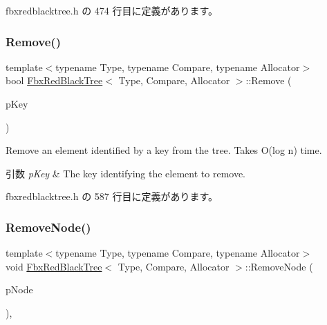  fbxredblacktree.\+h の 474 行目に定義があります。

\mbox{\label{class_fbx_red_black_tree_a432f0ed569c5ccb0273c583e59414b0b}} 
\subsubsection{\texorpdfstring{Remove()}{Remove()}}
{\footnotesize\ttfamily template$<$typename Type, typename Compare, typename Allocator$>$ \\
bool \hyperlink{class_fbx_red_black_tree}{Fbx\+Red\+Black\+Tree}$<$ Type, Compare, Allocator $>$\+::Remove (\begin{DoxyParamCaption}\item[{const \hyperlink{class_fbx_red_black_tree_a241b31c6972995417d193458b7bb27e2}{Key\+Type} \&}]{p\+Key }\end{DoxyParamCaption})\hspace{0.3cm}{\ttfamily [inline]}}

Remove an element identified by a key from the tree. Takes O(log n) time. 
\begin{DoxyParams}{引数}
{\em p\+Key} & The key identifying the element to remove. \\
\hline
\end{DoxyParams}


 fbxredblacktree.\+h の 587 行目に定義があります。

\mbox{\label{class_fbx_red_black_tree_af0e3ffcca91f083d958bec08fbd20100}} 
\subsubsection{\texorpdfstring{Remove\+Node()}{RemoveNode()}}
{\footnotesize\ttfamily template$<$typename Type, typename Compare, typename Allocator$>$ \\
void \hyperlink{class_fbx_red_black_tree}{Fbx\+Red\+Black\+Tree}$<$ Type, Compare, Allocator $>$\+::Remove\+Node (\begin{DoxyParamCaption}\item[{\hyperlink{class_fbx_red_black_tree_1_1_record_type}{Record\+Type} $\ast$}]{p\+Node }\end{DoxyParamCaption})\hspace{0.3cm}{\ttfamily [inline]}, {\ttfamily [protected]}}



